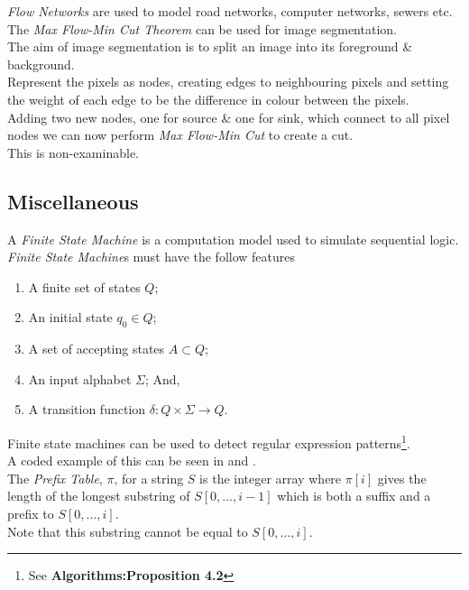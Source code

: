 \documentclass[11pt,a4paper]{article}
\begin{document}
\textit{Flow Networks} are used to model road networks, computer networks, sewers etc.\\

The \textit{Max Flow-Min Cut Theorem} can be used for image segmentation.\\
The aim of image segmentation is to split an image into its foreground \& background.\\
Represent the pixels as nodes, creating edges to neighbouring pixels and setting the weight of each edge to be the difference in colour between the pixels.\\
Adding two new nodes, one for source \& one for sink, which connect to all pixel nodes we can now perform \textit{Max Flow-Min Cut} to create a cut.\\
\nb This is non-examinable.

\subsection{Miscellaneous}

A \textit{Finite State Machine} is a computation model used to simulate sequential logic.\\
\textit{Finite State Machine}s must have the follow features
\begin{enumerate}[label=\roman*)]
  \item A finite set of states $Q$;
  \item An initial state $q_0\in Q$;
  \item A set of accepting states $A\subset Q$;
  \item An input alphabet $\Sigma$; And,
  \item A transition function $\delta:Q\times\Sigma \to Q$.
\end{enumerate}

Finite state machines can be used to detect regular expression patterns\footnote{See \textbf{Algorithms:Proposition 4.2}}.\\
\nb A coded example of this can be seen in {} and {}.\\

The \textit{Prefix Table}, $\pi$, for a string $S$ is the integer array where $\pi[i]$ gives the length of the longest substring of $S[0,\dots,i-1]$ which is both a suffix and a prefix to $S[0,\dots,i]$.\\
Note that this substring cannot be equal to $S[0,\dots,i]$.\\
\end{document}
